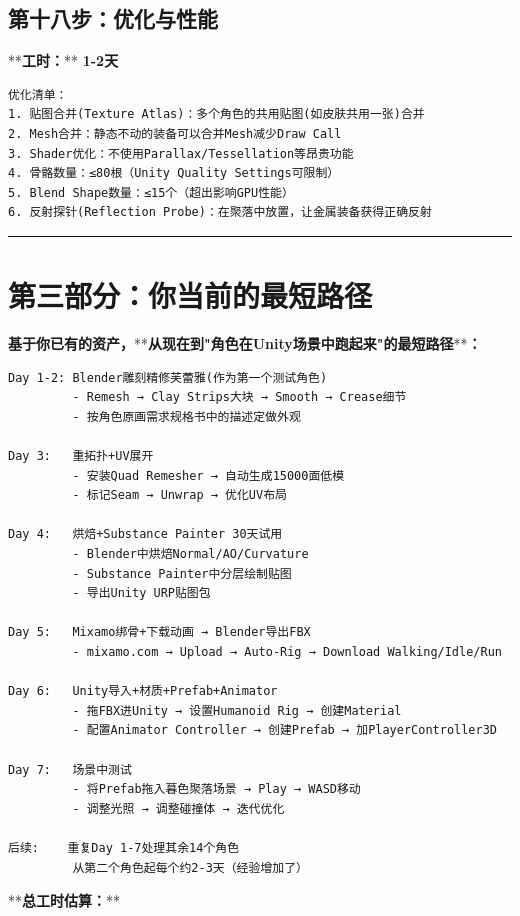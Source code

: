 \documentclass[12pt,a4paper,openany]{ctexbook}
\begin{document}
\section*{第十八步：优化与性能}


**\textbf{工时：}**\textbf{ 1-2天}


\begin{verbatim}
优化清单：
1. 贴图合并(Texture Atlas)：多个角色的共用贴图(如皮肤共用一张)合并
2. Mesh合并：静态不动的装备可以合并Mesh减少Draw Call
3. Shader优化：不使用Parallax/Tessellation等昂贵功能
4. 骨骼数量：≤80根（Unity Quality Settings可限制）
5. Blend Shape数量：≤15个（超出影响GPU性能）
6. 反射探针(Reflection Probe)：在聚落中放置，让金属装备获得正确反射
\end{verbatim}


\bigskip\hrule\bigskip


\chapter{第三部分：你当前的最短路径}


\textbf{基于你已有的资产，}**\textbf{从现在到"角色在Unity场景中跑起来"的最短路径}**\textbf{：}


\begin{verbatim}
Day 1-2: Blender雕刻精修芙蕾雅(作为第一个测试角色)
         - Remesh → Clay Strips大块 → Smooth → Crease细节
         - 按角色原画需求规格书中的描述定做外观

Day 3:   重拓扑+UV展开
         - 安装Quad Remesher → 自动生成15000面低模
         - 标记Seam → Unwrap → 优化UV布局

Day 4:   烘焙+Substance Painter 30天试用
         - Blender中烘焙Normal/AO/Curvature
         - Substance Painter中分层绘制贴图
         - 导出Unity URP贴图包

Day 5:   Mixamo绑骨+下载动画 → Blender导出FBX
         - mixamo.com → Upload → Auto-Rig → Download Walking/Idle/Run

Day 6:   Unity导入+材质+Prefab+Animator
         - 拖FBX进Unity → 设置Humanoid Rig → 创建Material
         - 配置Animator Controller → 创建Prefab → 加PlayerController3D

Day 7:   场景中测试
         - 将Prefab拖入暮色聚落场景 → Play → WASD移动
         - 调整光照 → 调整碰撞体 → 迭代优化

后续:    重复Day 1-7处理其余14个角色
         从第二个角色起每个约2-3天（经验增加了）
\end{verbatim}


**\textbf{总工时估算：}**
\end{document}
